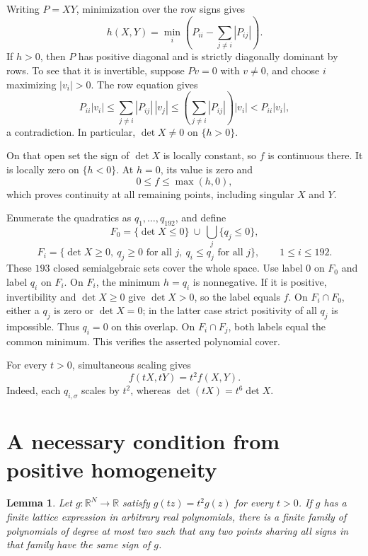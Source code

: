 \documentclass[11pt]{article}
\newcommand{\R}{\mathbb R}
\newtheorem{lemma}{Lemma}
\begin{document}
Writing \(P=XY\), minimization over the row signs gives
\[
 h(X,Y)=\min_i\left(P_{ii}-\sum_{j\ne i}|P_{ij}|\right).
\]
If \(h>0\), then \(P\) has positive diagonal and is strictly diagonally
dominant by rows. To see that it is invertible, suppose \(Pv=0\) with
\(v\ne0\), and choose \(i\) maximizing \(|v_i|>0\). The row equation gives
\[
 P_{ii}|v_i|
 \le \sum_{j\ne i}|P_{ij}|\,|v_j|
 \le \left(\sum_{j\ne i}|P_{ij}|\right)|v_i|
 <P_{ii}|v_i|,
\]
a contradiction. In particular, \(\det X\ne0\) on \(\{h>0\}\).

On that open set the sign of \(\det X\) is locally constant, so \(f\)
is continuous there. It is locally zero on \(\{h<0\}\). At \(h=0\),
its value is zero and
\[
 0\le f\le\max(h,0),
\]
which proves continuity at all remaining points, including singular
\(X\) and \(Y\).

Enumerate the quadratics as \(q_1,\ldots,q_{192}\), and define
\[
 F_0=\{\det X\le0\}\ \cup\ \bigcup_j\{q_j\le0\},
\]
\[
 F_i=\{\det X\ge0,\ q_j\ge0\text{ for all }j,\
                    q_i\le q_j\text{ for all }j\},
 \qquad 1\le i\le192.
\]
These \(193\) closed semialgebraic sets cover the whole space. Use
label \(0\) on \(F_0\) and label \(q_i\) on \(F_i\). On \(F_i\),
the minimum \(h=q_i\) is nonnegative. If it is positive, invertibility
and \(\det X\ge0\) give \(\det X>0\), so the label equals \(f\).
On \(F_i\cap F_0\), either a \(q_j\) is zero or \(\det X=0\);
in the latter case strict positivity of all \(q_j\) is impossible.
Thus \(q_i=0\) on this overlap. On \(F_i\cap F_j\), both labels
equal the common minimum. This verifies the asserted polynomial cover.

For every \(t>0\), simultaneous scaling gives
\begin{equation}\label{eq:homogeneous}
 f(tX,tY)=t^2f(X,Y).
\end{equation}
Indeed, each \(q_{i,\sigma}\) scales by \(t^2\), whereas
\(\det(tX)=t^6\det X\).

\section{A necessary condition from positive homogeneity}

\begin{lemma}\label{lem:sign}
Let \(g:\R^N\to\R\) satisfy \(g(tz)=t^2g(z)\) for every \(t>0\).
If \(g\) has a finite lattice expression in arbitrary real polynomials,
there is a finite family of polynomials of degree at most two such
that any two points sharing all signs in that family have the same
sign of \(g\).
\end{lemma}
\end{document}

